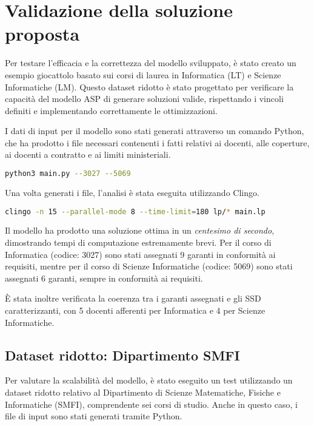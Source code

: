 \section{Validazione della soluzione proposta}
\label{sec:expval}

Per testare l'efficacia e la correttezza del modello sviluppato, è stato creato un esempio 
giocattolo basato sui corsi di laurea in Informatica (LT) e Scienze Informatiche (LM). 
Questo dataset ridotto è stato progettato per verificare la capacità del modello ASP di 
generare soluzioni valide, rispettando i vincoli definiti e implementando correttamente 
le ottimizzazioni.

I dati di input per il modello sono stati generati attraverso un comando Python, che ha 
prodotto i file necessari contenenti i fatti relativi ai docenti, alle coperture, ai 
docenti a contratto e ai limiti ministeriali.

\begin{lstlisting}[language=bash]
 python3 main.py --3027 --5069
\end{lstlisting}

Una volta generati i file, l'analisi è stata eseguita utilizzando Clingo.

\begin{lstlisting}[language=bash]
 clingo -n 15 --parallel-mode 8 --time-limit=180 lp/* main.lp
\end{lstlisting}

Il modello ha prodotto una soluzione ottima in un \textit{centesimo di secondo}, 
dimostrando tempi di computazione estremamente brevi. Per il corso di Informatica 
(codice: 3027) sono stati assegnati 9 garanti in conformità ai requisiti, mentre per il corso di 
Scienze Informatiche (codice: 5069) sono stati assegnati 6 garanti, sempre in conformità ai 
requisiti.

È stata inoltre verificata la coerenza tra i garanti assegnati e gli SSD caratterizzanti, 
con 5 docenti afferenti per Informatica e 4 per Scienze Informatiche.

\subsection{Dataset ridotto: Dipartimento SMFI}
\label{sec:-dataset-dipartimento-smfi}

Per valutare la scalabilità del modello, è stato eseguito un test utilizzando un dataset 
ridotto relativo al Dipartimento di Scienze Matematiche, Fisiche e Informatiche (SMFI), 
comprendente sei corsi di studio. Anche in questo caso, i file di input sono stati generati 
tramite Python.

